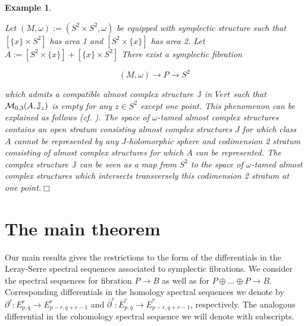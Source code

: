 \documentclass[a4paper,14pt]{article}
\newcommand{\B}[1]{\mathbb #1}
\newcommand{\C}[1]{{\cal #1}}
\newcommand{\om}{{\omega}}
\newcommand{\Mo}{(M,\omega )}
\newcommand{\moplus}{\oplus \dots \oplus}
\newcommand{\QED}{\hfill$\Box$\medskip}
\newcommand{\NI}{{\noindent}}
\newtheorem{ex}[theorem]{Example}
\numberwithin{equation}{section}
\begin{document}
\begin{ex}\label{E:hir}
{\em
Let $\Mo:=(S^2\times S^2,\om )$ be equipped with symplectic structure
such that $[\{x\}\times S^2]$ has area 1 and $[S^2\times \{x\}]$
has area 2. Let $A:=[S^2\times \{x\}] + [\{x\}\times S^2]$
There exist a symplectic fibration

$$\Mo \to P\to S^2$$


\NI
which admits a compatible almost complex structure $\B J$ in $Vert$
such that $\C M_{0,3}(A,\B J_z)$ is empty for any $z\in S^2$ except
one point. 
This phenomenon can be explained as follows (cf. \cite{am}). 
The space of 
$\om $-tamed almost complex structures contains an open
stratum consisting almost complex structures $J$ for which
class $A$ cannot be represented by any $J$-holomorphic
sphere and codimension 2 stratum consisting of almost
complex structures for which $A$ can be represented.
The complex structure $\B J$ can be seen as a map
from $S^2$ to the space of $\om $-tamed almost complex
structures which intersects transversely this codimension
2 stratum at one point.\QED
}
\end{ex}































\section{The main theorem}\label{S:main}

Our main results gives the restrictions to the form of the
differentials in the 
Leray-Serre spectral sequences associated to symplectic
fibrations. We consider the spectral sequences for
fibration $P\to B$ as well as for $P\moplus P\to B$.
Corresponding differentials in the homology spectral
sequences we denote by $\partial ^r:E^r_{p,q}\to E^r_{p-r,q+r-1}$
and $\overline \partial ^r:\overline {E}^r_{p,q}\to 
\overline E^r_{p-r,q+r-1}$, respectively. The analogous
differential in the cohomology spectral sequence we
will denote with subscripts.
\end{document}
